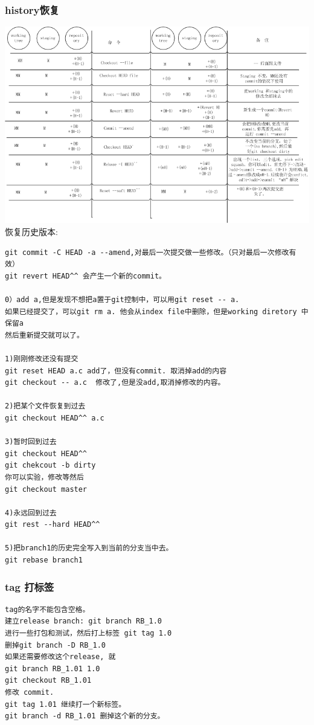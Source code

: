 \documentclass[a4paper,12pt,twoside]{book}
\begin{document}
\begin{CJK*}{UTF8}{song}
\subsubsection{history恢复}
\includegraphics[scale=0.6]{pics/git-history} \\

恢复历史版本: \\
\begin{verbatim}
git commit -C HEAD -a --amend,对最后一次提交做一些修改。（只对最后一次修改有效）
git revert HEAD^^ 会产生一个新的commit。

0）add a,但是发现不想把a置于git控制中，可以用git reset -- a. 
如果已经提交了，可以git rm a. 他会从index file中删除，但是working diretory 中保留a
然后重新提交就可以了。

1)刚刚修改还没有提交
git reset HEAD a.c add了，但没有commit. 取消掉add的内容
git checkout -- a.c  修改了,但是没add,取消掉修改的内容。

2)把某个文件恢复到过去
git checkout HEAD^^ a.c

3)暂时回到过去
git checkout HEAD^^
git chekcout -b dirty
你可以实验，修改等然后
git checkout master

4)永远回到过去
git rest --hard HEAD^^

5)把branch1的历史完全写入到当前的分支当中去。
git rebase branch1
\end{verbatim}



\subsubsection{tag 打标签}
\begin{verbatim}
tag的名字不能包含空格。
建立release branch: git branch RB_1.0
进行一些打包和测试，然后打上标签 git tag 1.0
删掉git branch -D RB_1.0
如果还需要修改这个release, 就
git branch RB_1.01 1.0
git checkout RB_1.01
修改 commit.
git tag 1.01 继续打一个新标签。
git branch -d RB_1.01 删掉这个新的分支。


\end{verbatim}
\end{CJK*}
\end{document}
